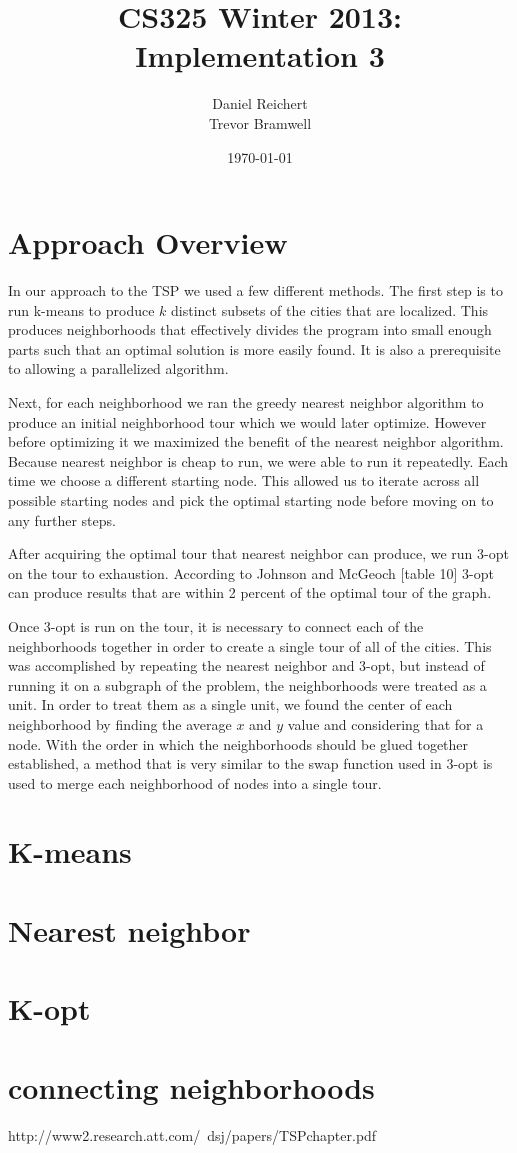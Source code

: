 \documentclass[12pt]{article}
\title{CS325 Winter 2013: Implementation 3}
\author{
    Daniel Reichert \\
    Trevor Bramwell
}
\date{\today}
\begin{document}
\maketitle

\section*{Approach Overview}

In our approach to the TSP we used a few different methods.  The first step is
to run k-means to produce $k$ distinct subsets of the cities that are
localized.  This produces neighborhoods that effectively divides the program
into small enough parts such that an optimal solution is more easily found.  It
is also a prerequisite to allowing a parallelized algorithm.  

Next, for each neighborhood we ran the greedy nearest neighbor algorithm to
produce an initial neighborhood tour which we would later optimize. However
before optimizing it we maximized the benefit of the nearest neighbor
algorithm. Because nearest neighbor is cheap to run, we were able to run it
repeatedly. Each time we choose a different starting node. This allowed us to
iterate across all possible starting nodes and pick the optimal starting node
before moving on to any further steps.

After acquiring the optimal tour that nearest neighbor can produce, we run
3-opt on the tour to exhaustion. According to Johnson and McGeoch [table 10]
3-opt can produce results that are within 2 percent of the optimal tour of the
graph.

Once 3-opt is run on the tour, it is necessary to connect each of the
neighborhoods together in order to create a single tour of all of the cities.
This was accomplished by repeating the nearest neighbor and 3-opt, but instead
of running it on a subgraph of the problem, the neighborhoods were treated as a
unit.  In order to treat them as a single unit, we found the center of each
neighborhood by finding the average $x$ and $y$ value and considering that for
a node.  With the order in which the neighborhoods should be glued together
established, a method that is very similar to the swap function used in 3-opt
is used to merge each neighborhood of nodes into a single tour.


\section*{K-means}
\section*{Nearest neighbor}
\section*{K-opt}
\section*{connecting neighborhoods}

http://www2.research.att.com/~dsj/papers/TSPchapter.pdf
\end{document}

